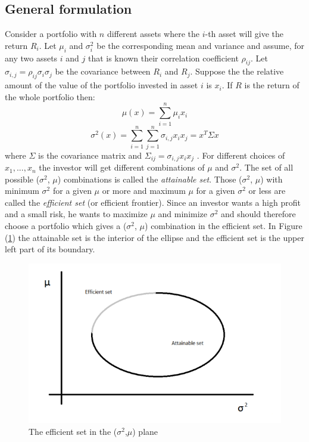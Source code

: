 \subsection{General formulation}
Consider a portfolio with $n$ different assets where the $i$-th asset will give the return $R_i$. Let $\mu_i$ and $\sigma^2_i$ be the corresponding mean and variance and assume, for any two assets $i$ and $j$ that is known their correlation coefficient $\rho_{ij}$. Let $\sigma_{i,j} = \rho_{ij}\sigma_i\sigma_j$ be the covariance between $R_i$ and $R_j$. Suppose the the relative amount of the value of the portfolio invested in asset $i$ is $x_i$. If $R$ is the return of the whole portfolio then:
\begin{equation}
\mu(x) =  \sum\limits_{i=1}^n\mu_i x_i 
\end{equation}
\begin{equation}
\sigma^2(x) = \sum\limits_{i=1}^n\sum\limits_{j=1}^n\sigma_{i,j}x_i x_j = x^T \Sigma x
\end{equation}
where $\Sigma$ is the covariance matrix and $\Sigma_{ij} = \sigma_{i,j}x_i x_j$ \cite{markovitz}.
For different choices of $x_1, ..., x_n$ the investor will get different combinations of $\mu$ and $\sigma^2$. The set of all possible ($\sigma^2$, $\mu$) combinations is called the \textit{attainable set}. Those ($\sigma^2$, $\mu$) with minimum $\sigma^2$ for a given $\mu$ or more and maximum $\mu$ for a given $\sigma^2$ or less are called the \textit{efficient set} (or efficient frontier). Since an investor wants a high profit and a small risk, he wants to maximize $\mu$ and minimize $\sigma^2$ and should therefore choose a portfolio which gives a ($\sigma^2$, $\mu$) combination in the efficient set. In Figure (\ref{fig:efficient}) the attainable set is the interior of the ellipse and the efficient set is the upper left part of its boundary. \\
\begin{figure}
\centering
\includegraphics[scale=0.9]{efficient_set} 
\caption{The efficient set in the ($\sigma^2$,$\mu$) plane}
\label{fig:efficient}
\end{figure}

